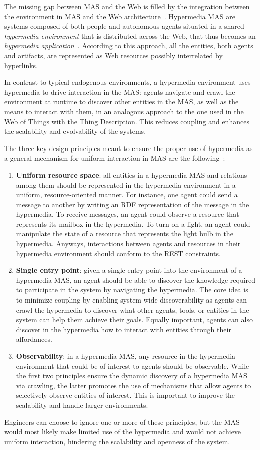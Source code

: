 The missing gap between MAS and the Web is filled by the integration between the environment in MAS and the Web architecture~\cite{ciortea2019}.
Hypermedia MAS are systems composed of both people and autonomous agents situated in a shared \textit{hypermedia environment} that is distributed across the Web, that thus becomes an \textit{hypermedia application}~\cite{ciortea2018}.
According to this approach, all the entities, both agents and artifacts, are represented as Web resources possibly interrelated by hyperlinks.

In contrast to typical endogenous environments, a hypermedia environment uses hypermedia to drive interaction in the MAS: agents navigate and crawl the environment at runtime to discover other entities in the MAS, as well as the means to interact with them, in an analogous approach to the one used in the Web of Things with the Thing Description.
This reduces coupling and enhances the scalability and evolvability of the systems.

The three key design principles meant to ensure the proper use of hypermedia as a general mechanism for uniform interaction in MAS are the following~\cite{10.1007/978-3-030-25693-7_15}:
\begin{enumerate}
    \item \textbf{Uniform resource space}: all entities in a hypermedia MAS and relations among them should be represented in the hypermedia environment in a uniform, resource-oriented manner.
    For instance, one agent could send a message to another by writing an RDF representation of the message in the hypermedia.
    To receive messages, an agent could observe a resource that represents its mailbox in the hypermedia.
    To turn on a light, an agent could manipulate the state of a resource that represents the light bulb in the hypermedia.
    Anyways, interactions between agents and resources in their hypermedia environment should conform to the REST constraints.
    \item \textbf{Single entry point}: given a single entry point into the environment of a hypermedia MAS, an agent should be able to discover the knowledge required to participate in the system by navigating the hypermedia.
    The core idea is to minimize coupling by enabling system-wide discoverability as agents can crawl the hypermedia to discover what other agents, tools, or entities in the system can help them achieve their goals.
    Equally important, agents can also discover in the hypermedia how to interact with entities through their affordances.
    \item \textbf{Observability}: in a hypermedia MAS, any resource in the hypermedia environment that could be of interest to agents should be observable.
    While the first two principles ensure the dynamic discovery of a hypermedia MAS via crawling, the latter promotes the use of mechanisms that allow agents to selectively observe entities of interest.
    This is important to improve the scalability and handle larger environments.
\end{enumerate}

Engineers can choose to ignore one or more of these principles, but the MAS would most likely make limited use of the hypermedia and would not achieve uniform interaction, hindering the scalability and openness of the system.
